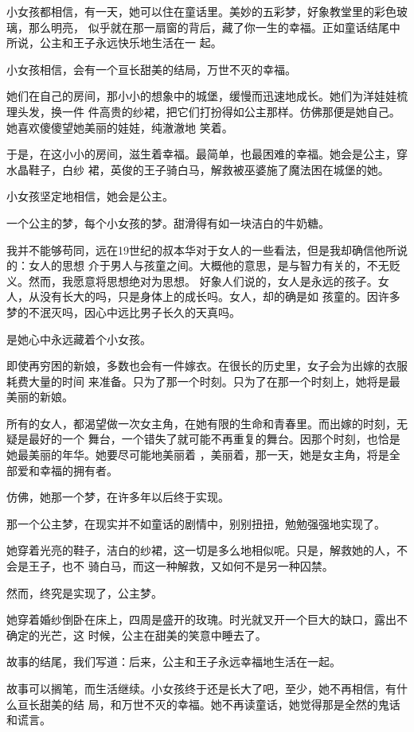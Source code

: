\documentclass[12pt,a4paper]{article}
\begin{document}
		小女孩都相信，有一天，她可以住在童话里。美妙的五彩梦，好象教堂里的彩色玻璃，那么明亮，
	似乎就在那一扇窗的背后，藏了你一生的幸福。正如童话结尾中所说，公主和王子永远快乐地生活在一
	起。

		小女孩相信，会有一个亘长甜美的结局，万世不灭的幸福。

		她们在自己的房间，那小小的想象中的城堡，缓慢而迅速地成长。她们为洋娃娃梳理头发，换一件
	件高贵的纱裙，把它们打扮得如公主那样。仿佛那便是她自己。她喜欢傻傻望她美丽的娃娃，纯澈澈地
	笑着。

		于是，在这小小的房间，滋生着幸福。最简单，也最困难的幸福。她会是公主，穿水晶鞋子，白纱
	裙，英俊的王子骑白马，解救被巫婆施了魔法困在城堡的她。

		小女孩坚定地相信，她会是公主。

		一个公主的梦，每个小女孩的梦。甜滑得有如一块洁白的牛奶糖。

		我并不能够苟同，远在19世纪的叔本华对于女人的一些看法，但是我却确信他所说的：女人的思想
	介于男人与孩童之间。大概他的意思，是与智力有关的，不无贬义。然而，我愿意将思想绝对为思想。
	好象人们说的，女人是永远的孩子。女人，从没有长大的吗，只是身体上的成长吗。女人，却的确是如
	孩童的。因许多梦的不泯灭吗，因心中远比男子长久的天真吗。

		是她心中永远藏着个小女孩。

		即使再穷困的新娘，多数也会有一件嫁衣。在很长的历史里，女子会为出嫁的衣服耗费大量的时间
	来准备。只为了那一个时刻。只为了在那一个时刻上，她将是最美丽的新娘。

		所有的女人，都渴望做一次女主角，在她有限的生命和青春里。而出嫁的时刻，无疑是最好的一个
	舞台，一个错失了就可能不再重复的舞台。因那个时刻，也恰是她最美丽的年华。她要尽可能地美丽着
	，美丽着，那一天，她是女主角，将是全部爱和幸福的拥有者。

		仿佛，她那一个梦，在许多年以后终于实现。

		那一个公主梦，在现实并不如童话的剧情中，别别扭扭，勉勉强强地实现了。

		她穿着光亮的鞋子，洁白的纱裙，这一切是多么地相似呢。只是，解救她的人，不会是王子，也不
	骑白马，而这一种解救，又如何不是另一种囚禁。

		然而，终究是实现了，公主梦。

		她穿着婚纱倒卧在床上，四周是盛开的玫瑰。时光就叉开一个巨大的缺口，露出不确定的光芒，这
	时候，公主在甜美的笑意中睡去了。

		故事的结尾，我们写道：后来，公主和王子永远幸福地生活在一起。

		故事可以搁笔，而生活继续。小女孩终于还是长大了吧，至少，她不再相信，有什么亘长甜美的结
	局，和万世不灭的幸福。她不再读童话，她觉得那是全然的鬼话和谎言。
\end{document}

